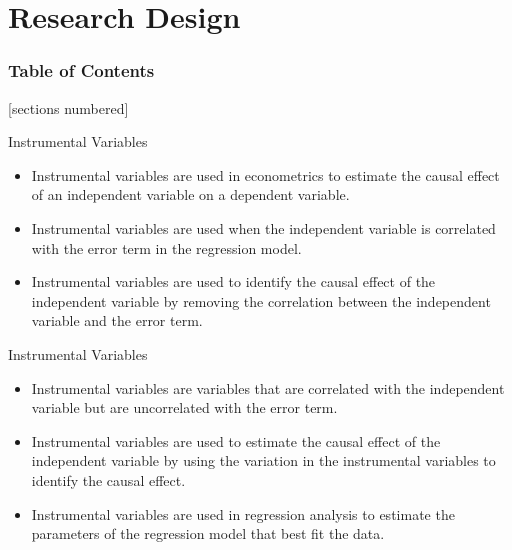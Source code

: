 \documentclass[serif, 9pt, aspectratio=32]{beamer}
\begin{document}




\section{Research Design}

\begin{frame}
    \frametitle{Table of Contents}
    [sections numbered]
    \tableofcontents[currentsection]
\end{frame}

\begin{frame}{Instrumental Variables}
    \begin{itemize}
        \setlength{\itemsep}{2em}
        \item Instrumental variables are used in econometrics to estimate the causal effect of an independent variable on a dependent variable.
        \item Instrumental variables are used when the independent variable is correlated with the error term in the regression model.
        \item Instrumental variables are used to identify the causal effect of the independent variable by removing the correlation between the independent variable and the error term.
    \end{itemize}
\end{frame}

\begin{frame}{Instrumental Variables}
    \begin{itemize}
        \setlength{\itemsep}{2em}
        \item Instrumental variables are variables that are correlated with the independent variable but are uncorrelated with the error term.
        \item Instrumental variables are used to estimate the causal effect of the independent variable by using the variation in the instrumental variables to identify the causal effect.
        \item Instrumental variables are used in regression analysis to estimate the parameters of the regression model that best fit the data.
    \end{itemize}
\end{frame}
\end{document}
